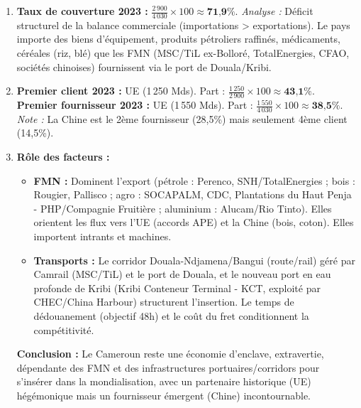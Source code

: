 \documentclass[11pt]{article}
\begin{document}
\begin{exoresolu}
\begin{enumerate}
\begin{align*}
    \end{align*}
    \textit{Interprétation :} Le taux est stable autour de 24\%, niveau modéré (moyenne SSA $\approx$ 50-60\%). L'économie reste peu ouverte, freinée par l'informel, les barrières non tarifaires et la faible transformation locale. La légère baisse s'explique par une croissance du PIB (gaz, BTP) plus rapide que celle du commerce.
    \item \textbf{Taux de couverture 2023 :} $\frac{2\,900}{4\,030} \times 100 \approx \textbf{71,9\%}$.
    \textit{Analyse :} Déficit structurel de la balance commerciale (importations > exportations). Le pays importe des biens d'équipement, produits pétroliers raffinés, médicaments, céréales (riz, blé) que les FMN (MSC/TiL ex-Bolloré, TotalEnergies, CFAO, sociétés chinoises) fournissent via le port de Douala/Kribi.
    \item \textbf{Premier client 2023 :} UE (1\,250 Mds). Part : $\frac{1\,250}{2\,900} \times 100 \approx \textbf{43,1\%}$.
    \textbf{Premier fournisseur 2023 :} UE (1\,550 Mds). Part : $\frac{1\,550}{4\,030} \times 100 \approx \textbf{38,5\%}$.
    \textit{Note :} La Chine est le 2ème fournisseur (28,5\%) mais seulement 4ème client (14,5\%).
    \item \textbf{Rôle des facteurs :}
    \begin{itemize}
        \item \textbf{FMN :} Dominent l'export (pétrole : Perenco, SNH/TotalEnergies ; bois : Rougier, Pallisco ; agro : SOCAPALM, CDC, Plantations du Haut Penja - PHP/Compagnie Fruitière ; aluminium : Alucam/Rio Tinto). Elles orientent les flux vers l'UE (accords APE) et la Chine (bois, coton). Elles importent intrants et machines.
        \item \textbf{Transports :} Le corridor Douala-Ndjamena/Bangui (route/rail) géré par Camrail (MSC/TiL) et le port de Douala, et le nouveau port en eau profonde de Kribi (Kribi Conteneur Terminal - KCT, exploité par CHEC/China Harbour) structurent l'insertion. Le temps de dédouanement (objectif 48h) et le coût du fret conditionnent la compétitivité.
    \end{itemize}
    \textbf{Conclusion :} Le Cameroun reste une économie d'enclave, extravertie, dépendante des FMN et des infrastructures portuaires/corridors pour s'insérer dans la mondialisation, avec un partenaire historique (UE) hégémonique mais un fournisseur émergent (Chine) incontournable.
\end{enumerate}
\end{exoresolu}
\end{document}
